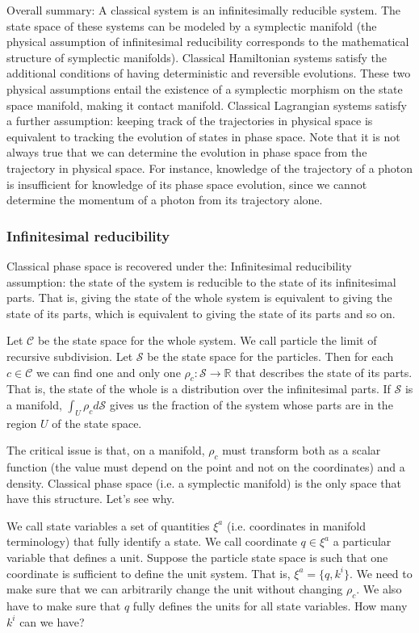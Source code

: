 \documentclass[letterpaper]{article}
\begin{document}
Overall summary: A classical system is an infinitesimally reducible system. The state space of these systems can be modeled by a symplectic manifold (the physical assumption of infinitesimal reducibility corresponds to the mathematical structure of symplectic manifolds). Classical Hamiltonian systems satisfy the additional conditions of having deterministic and reversible evolutions. These two physical assumptions entail the existence of a symplectic morphism on the state space manifold, making it contact manifold. Classical Lagrangian systems satisfy a further assumption: keeping track of the trajectories in physical space is equivalent to tracking the evolution of states in phase space. Note that it is not always true that we can determine the evolution in phase space from the trajectory in physical space. For instance, knowledge of the trajectory of a photon is insufficient for knowledge of its phase space evolution, since we cannot determine the momentum of a photon from its trajectory alone.

\subsubsection{Infinitesimal reducibility}

Classical phase space is recovered under the:
Infinitesimal reducibility assumption: the state of the system is reducible to the state of its infinitesimal parts. That is, giving the state of the whole system is equivalent to giving the state of its parts, which is equivalent to giving the state of its parts and so on.

Let $\mathcal{C}$ be the state space for the whole system. We call particle the limit of recursive subdivision. Let $\mathcal{S}$ be the state space for the particles. Then for each $c \in \mathcal{C}$ we can find one and only one $\rho_c : \mathcal{S} \to \mathbb{R} $ that describes the state of its parts. That is, the state of the whole is a distribution over the infinitesimal parts. If $\mathcal{S}$ is a manifold, $\int_U \rho_c d\mathcal{S}$ gives us the fraction of the system whose parts are in the region $U$ of the state space.

The critical issue is that, on a manifold, $\rho_c$ must transform both as a scalar function (the value must depend on the point and not on the coordinates) and a density. Classical phase space (i.e. a symplectic manifold) is the only space that have this structure. Let's see why.

We call state variables a set of quantities $\xi^a$ (i.e. coordinates in manifold terminology) that fully identify a state. We call coordinate $q \in \xi^a$ a particular variable that defines a unit. Suppose the particle state space is such that one coordinate is sufficient to define the unit system. That is, $\xi^a = \{ q, k^i \}$. We need to make sure that we can arbitrarily change the unit without changing $\rho_c$. We also have to make sure that $q$ fully defines the units for all state variables. How many $k^i$ can we have?
\end{document}
